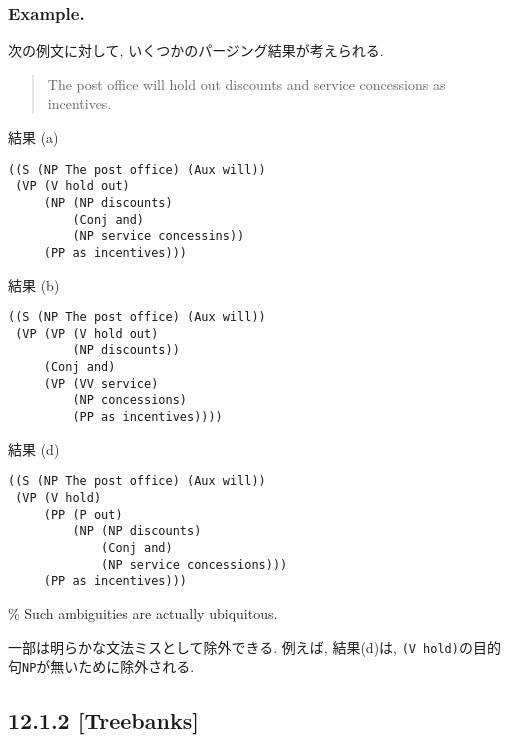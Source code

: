 \documentclass{beamer}
\begin{document}
\subsubsection{Example.}

\begin{frame}
次の例文に対して, いくつかのパージング結果が考えられる.

\begin{quote}
The post office will hold out discounts and service concessions as
incentives.
\end{quote}
\end{frame}

\begin{frame}[fragile]
結果 (a)

\begin{verbatim}
((S (NP The post office) (Aux will))
 (VP (V hold out)
     (NP (NP discounts)
         (Conj and)
         (NP service concessins))
     (PP as incentives)))
\end{verbatim}
\end{frame}

\begin{frame}[fragile]
結果 (b)

\begin{verbatim}
((S (NP The post office) (Aux will))
 (VP (VP (V hold out)
         (NP discounts))
     (Conj and)
     (VP (VV service)
         (NP concessions)
         (PP as incentives))))
\end{verbatim}
\end{frame}

\begin{frame}[fragile]
結果 (d)

\begin{verbatim}
((S (NP The post office) (Aux will))
 (VP (V hold)
     (PP (P out)
         (NP (NP discounts)
             (Conj and)
             (NP service concessions)))
     (PP as incentives)))
\end{verbatim}
\end{frame}

\begin{frame}
  \% Such ambiguities are actually ubiquitous.

  一部は明らかな文法ミスとして除外できる. 
  例えば, 結果(d)は, \texttt{(V hold)}の目的句\texttt{NP}が無いために除外される. 
\end{frame}

\subsection{12.1.2 {[}Treebanks{]}}
\end{document}
